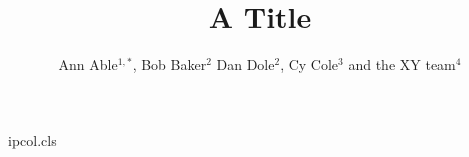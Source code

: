 \begin{filecontents*}[overwrite]{ipcol.cls}
\RequirePackage{hyperref}
\renewcommand{\author}[1]{{\raggedright #1\par}}
\newcommand{\affil}[1]{{\small\raggedright #1}}
\newcommand{\orcid}[1]{\href{https://orcid.org/#1}{(iD)}}
\end{filecontents*}
\documentclass{ipcol}

\title{A Title}
\author{Ann Able$^{1,*}$, Bob Baker$^2$ Dan Dole$^{2}$, Cy Cole$^{3}$ and the XY team$^{4}$}





\maketitle
Text.

